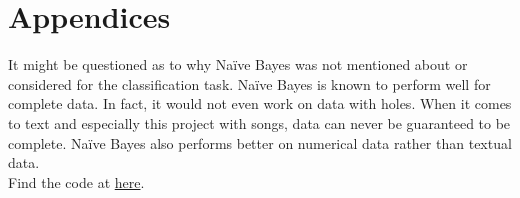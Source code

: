 \documentclass[11pt,a4paper]{article}
\begin{document}
\section{Appendices}
\label{sec:appendix}

It might be questioned as to why Naïve Bayes was not mentioned about or considered for the classification task. Naïve Bayes is known to perform well for complete data. In fact, it would not even work on data with holes. When it comes to text and especially this project with songs, data can never be guaranteed to be complete. Naïve Bayes also performs better on numerical data rather than textual data.\\
Find the code at \href{https://github.com/raviabhiram/mood-classification-with-lyrics}{here}.
\end{document}
